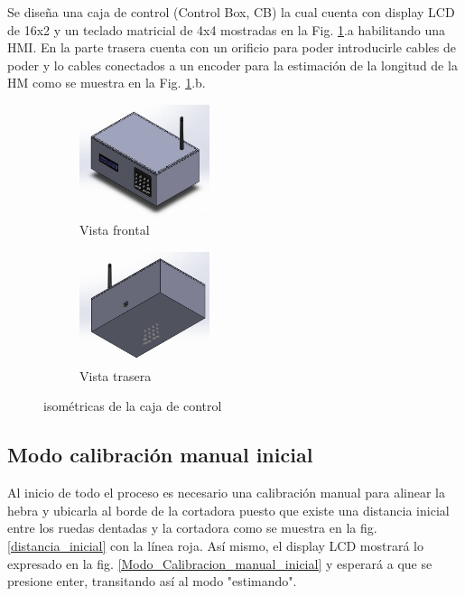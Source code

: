 \documentclass[main_conf.tex]{subfiles}
\begin{document}
Se diseña una caja de control (Control Box, CB) la cual cuenta
con display LCD de 16x2 y un teclado matricial de 4x4 mostradas
en la Fig. \ref{box:iso}.a habilitando una HMI. En la parte trasera
cuenta con un orificio para poder introducirle cables de poder y
lo cables conectados a un encoder para la estimación de la longitud
de la HM como se muestra en la Fig. \ref{box:iso}.b.

\begin{figure}[t]
  \centering
  \begin{subfigure}[b]{0.5\textwidth}
    \centering
    \includegraphics[width=1.5in]{../img/box/iso_front.png}
    \caption{Vista frontal}
  \end{subfigure}

  \begin{subfigure}[b]{0.5\textwidth}
    \centering
    \includegraphics[width=1.5in]{../img/box/iso_back.png}
    \caption{Vista trasera}
  \end{subfigure}

  \caption{isométricas de la caja de control}
  \label{box:iso}
\end{figure}


\subsection{Modo calibración manual inicial}
Al inicio de todo el proceso es necesario una calibración manual para
alinear la hebra y ubicarla al borde de la cortadora puesto que existe
una distancia inicial entre los ruedas dentadas y la cortadora como se
muestra en la fig. \ref{distancia_inicial} con la línea roja.
Así mismo, el display LCD mostrará lo expresado en la fig.
\ref{Modo_Calibracion_manual_inicial} y esperará a que se presione
enter, transitando así al modo "estimando".
\end{document}
